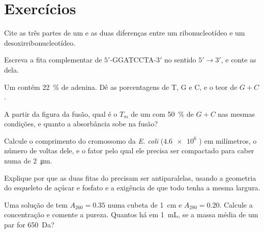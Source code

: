 \section{Exercícios}

\begin{exercise}[$\star$]\label{exo:b1:nucleic-acids:1}
Cite as três partes de um  e as duas diferenças entre um
ribonucleotídeo e um desoxirribonucleotídeo.
\end{exercise}

\begin{exercise}[$\star$]\label{exo:b1:nucleic-acids:2}
Escreva a fita complementar de $5'$-GGATCCTA-$3'$ no sentido
$5' \to 3'$, e conte as  dela.
\end{exercise}

\begin{exercise}[$\star$]\label{exo:b1:nucleic-acids:3}
Um  contém \qty{22}{\%} de adenina. Dê as porcentagens de T, G e C, e
o teor de $G + C$.
\end{exercise}

\begin{exercise}[$\star$]\label{exo:b1:nucleic-acids:4}
A partir da figura da fusão, qual é o $T_m$ de um  com \qty{50}{\%}
de $G + C$ nas mesmas condições, e quanto a absorbância sobe na fusão?
\end{exercise}

\begin{exercise}[$\star\star$]\label{exo:b1:nucleic-acids:5}
Calcule o comprimento do cromossomo da \emph{E. coli} ($\num{4.6e6}$
) em milímetros, o número de voltas dele, e o fator pelo
qual ele precisa ser compactado para caber numa  de
\qty{2}{\micro m}.
\end{exercise}

\begin{exercise}[$\star\star$]\label{exo:b1:nucleic-acids:6}
Explique por que as duas fitas do  precisam ser antiparalelas,
usando a geometria do esqueleto de açúcar e fosfato e a exigência de
que todo  tenha a mesma largura.
\end{exercise}

\begin{exercise}[$\star\star$]\label{exo:b1:nucleic-acids:7}
Uma solução de  tem $A_{260} = 0.35$ numa cubeta de \qty{1}{cm} e
$A_{280} = 0.20$. Calcule a concentração e comente a pureza. Quantos
 há em \qty{1}{mL}, se a massa média de um par for
\qty{650}{Da}?
\end{exercise}

